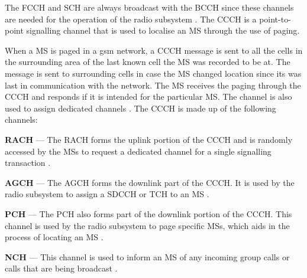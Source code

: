 The \gls{FCCH} and \gls{SCH} are always broadcast with the \gls{BCCH} since these channels are needed for the operation of the radio subsystem \cite{GSMArchitectureProtocolsServices}. The \gls{CCCH} is a point-to-point signalling channel that is used to localise an \gls{MS} through the use of paging\cite{GSMArchitectureProtocolsServices}. 

When a \gls{MS} is paged in a \gls{gsm} network, a \gls{CCCH} message is sent to all the cells in the surrounding area of the last known cell the \gls{MS} was recorded to be at\cite{GSMArchitectureProtocolsServices}. The message is sent to surrounding cells in case the \gls{MS} changed location since its was last in communication with the network\cite{GSMArchitectureProtocolsServices}. The \gls{MS} receives the paging through the \gls{CCCH} and responds if it is intended for the particular MS\cite{GSMArchitectureProtocolsServices}. The channel is also used to assign dedicated channels \cite{GSMArchitectureProtocolsServices}. The \gls{CCCH} is made up of the following channels:
\begin{description}
  \item{\textbf{\Gls{RACH}}} --- The \gls{RACH} forms the uplink portion of the \gls{CCCH} and is randomly accessed by the \glspl{MS} to request a dedicated channel for a single signalling transaction \cite{GSMArchitectureProtocolsServices}.
  \item{\textbf{\Gls{AGCH}}} --- The \gls{AGCH} forms the downlink part of the \gls{CCCH}\@. It is used by the radio subsystem to assign a \gls{SDCCH} or \gls{TCH} to an \gls{MS} \cite{GSMArchitectureProtocolsServices}.
  \item{\textbf{\Gls{PCH}}} --- The \gls{PCH} also forms part of the downlink portion of the \gls{CCCH}\@. This channel is used by the radio subsystem to page specific \glspl{MS}, which aids in the process of locating an \gls{MS} \cite{GSMArchitectureProtocolsServices}.
\item{\textbf{\Gls{NCH}}} --- This channel is used to inform an \gls{MS} of any incoming group calls or calls that are being broadcast \cite{GSMArchitectureProtocolsServices}.
\end{description}

